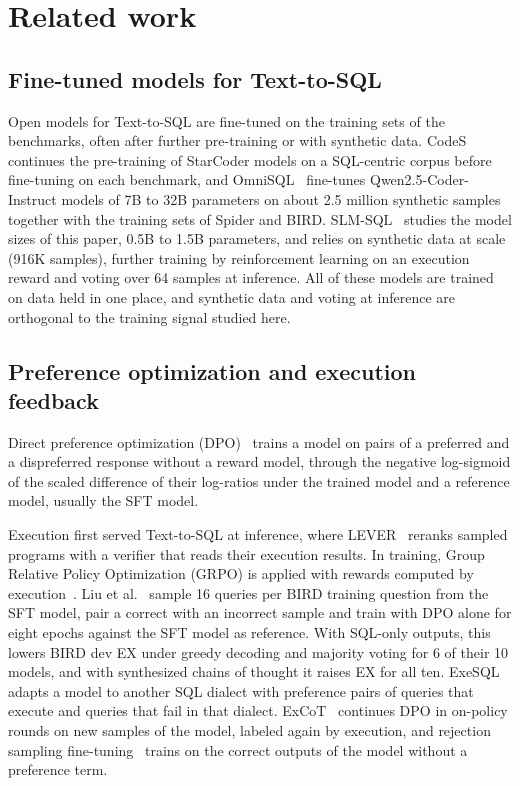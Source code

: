\section{Related work}\label{sec:related}

\subsection{Fine-tuned models for Text-to-SQL}\label{sec:rel-slm}

Open models for Text-to-SQL are fine-tuned on the training sets of the
benchmarks, often after further pre-training or with synthetic data.
CodeS~\cite{li2024codes} continues the pre-training of StarCoder models
on a SQL-centric corpus before fine-tuning on
each benchmark, and OmniSQL~\cite{li2025omnisql} fine-tunes
Qwen2.5-Coder-Instruct models of 7B to 32B parameters on about 2.5
million synthetic samples together with the training sets of Spider and
BIRD. SLM-SQL~\cite{sheng2025slmsql} studies the model sizes of this
paper, 0.5B to 1.5B parameters, and relies on synthetic data at scale
(916K samples), further training by reinforcement learning on an
execution reward and voting over 64 samples at inference. All of these
models are trained on data held in one place, and synthetic data and
voting at inference are orthogonal to the training signal studied
here.

\subsection{Preference optimization and execution feedback}\label{sec:rel-pref}

Direct preference optimization (DPO)~\cite{rafailov2023dpo} trains a
model on pairs of a preferred and a dispreferred response without a
reward model, through the negative log-sigmoid
of the scaled difference of their log-ratios under the trained model and
a reference model, usually the SFT model.

Execution first served Text-to-SQL at inference, where
LEVER~\cite{ni2023lever} reranks sampled programs with a verifier that
reads their execution results. In training, Group Relative Policy
Optimization (GRPO) is applied with rewards computed by
execution~\cite{papicchio2025think2sql,yao2026arctic,kulkarni2025reinforcing}.
Liu et al.~\cite{liu2025cotdpo} sample 16 queries per BIRD training
question from the SFT model, pair a correct with an incorrect sample and
train with DPO alone for eight epochs against the SFT model as
reference. With SQL-only outputs, this lowers BIRD dev EX under greedy
decoding and majority voting for 6 of their 10 models, and with
synthesized chains of thought it raises EX for all ten.
ExeSQL~\cite{zhang2025exesql} adapts a model to another SQL dialect with
preference pairs of queries that execute and queries that fail in that
dialect. ExCoT~\cite{zhai2025excot} continues
DPO in on-policy rounds on new samples of the model, labeled again by
execution, and rejection sampling fine-tuning~\cite{yuan2023rft} trains
on the correct outputs of the model without a preference term.

